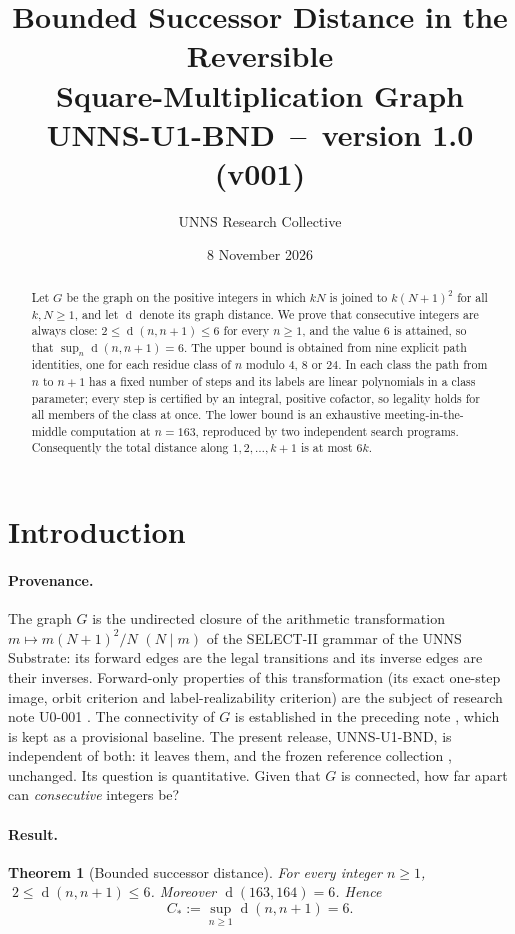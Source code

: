 \documentclass[11pt]{article}
\title{\textbf{Bounded Successor Distance in the Reversible\\ Square-Multiplication Graph}\\[4pt]
\large UNNS-U1-BND \,--\, version 1.0 (v001)}
\author{UNNS Research Collective}
\date{8 November 2026}
\newtheorem{theorem}{Theorem}[section]
\theoremstyle{definition}
\newcommand{\dist}{\operatorname{d}}
\begin{document}
\maketitle

\begin{abstract}
\noindent Let $G$ be the graph on the positive integers in which $kN$ is joined to $k(N+1)^2$ for all $k,N\ge 1$,
and let $\dist$ denote its graph distance. We prove that consecutive integers are always close:
$2\le \dist(n,n+1)\le 6$ for every $n\ge 1$, and the value $6$ is attained, so that
$\sup_{n}\dist(n,n+1)=6$. The upper bound is obtained from nine explicit path identities, one for each
residue class of $n$ modulo $4$, $8$ or $24$. In each class the path from $n$ to $n+1$ has a fixed number of steps
and its labels are linear polynomials in a class parameter; every step is certified by an integral, positive
cofactor, so legality holds for all members of the class at once. The lower bound is an exhaustive
meeting-in-the-middle computation at $n=163$, reproduced by two independent search programs. Consequently the
total distance along $1,2,\dots,k+1$ is at most $6k$.
\end{abstract}

\section{Introduction}\label{sec:intro}

\paragraph{Provenance.}
The graph $G$ is the undirected closure of the arithmetic transformation
$m\mapsto m(N+1)^2/N$ $(N\mid m)$ of the SELECT-II grammar of the UNNS Substrate: its forward edges are the legal
transitions and its inverse edges are their inverses. Forward-only properties of this transformation (its exact
one-step image, orbit criterion and label-realizability criterion) are the subject of research note U0-001 \cite{u0}.
The connectivity of $G$ is established in the preceding note \cite{u1}, which is kept as a provisional baseline.
The present release, UNNS-U1-BND, is independent of both: it leaves them, and the frozen reference collection
\cite{gig,repo}, unchanged. Its question is quantitative. Given that $G$ is connected, how far apart can
\emph{consecutive} integers be?

\paragraph{Result.}
\begin{theorem}[Bounded successor distance]\label{thm:main}
For every integer $n\ge 1$, $\;2\le \dist(n,n+1)\le 6$. Moreover $\dist(163,164)=6$. Hence
\[
C_\ast:=\sup_{n\ge 1}\dist(n,n+1)=6 .
\]
\end{theorem}
\end{document}
